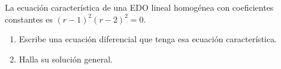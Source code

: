 La ecuación característica de una EDO lineal homogénea con coeficientes constantes es \((r-1)^2(r-2)^2=0\).

\begin{enumerate}[label=(\alph*),ref=\alph*,leftmargin=*]
\item Escribe una ecuación diferencial que tenga esa ecuación característica.
\item Halla su solución general.
\end{enumerate}
